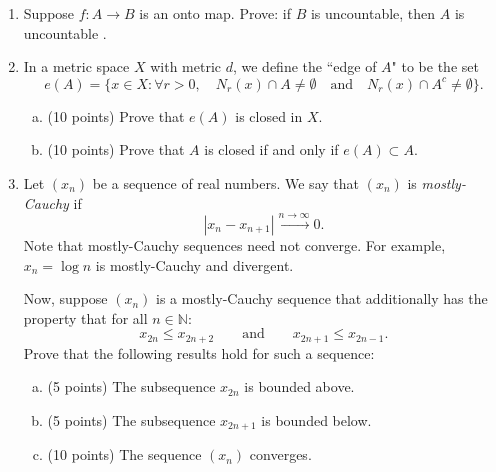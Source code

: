 \documentclass{amsart}
\begin{document}
\begin{enumerate}[1.]
\newpage
\item Suppose $f: A \to B$ is an onto map. Prove: if $B$ is uncountable, then $A$ is uncountable .

\newpage
\item In a metric space $X$ with metric $d$, we define the ``edge of $A$" to be the set
\[ e(A)=\{ x\in X : \forall r >0, \quad N_r(x)\cap A\neq \emptyset \quad \text{and} \quad N_r(x)\cap A^c \neq \emptyset   \}.\]
\begin{enumerate}[(a)]
	\item (10 points) Prove that $e(A)$ is closed in $X$.
	\item (10 points) Prove that $A$ is closed if and only if $e(A)\subset A$.
\end{enumerate}

\newpage
\item Let $(x_n)$ be a sequence of real numbers. We say that $(x_n)$ is \emph{mostly-Cauchy} if
\[ |x_n - x_{n+1}| \xrightarrow{n \to \infty} 0.\]
Note that mostly-Cauchy sequences need not converge. For example, $x_n=\log n$ is mostly-Cauchy and divergent.

Now, suppose $(x_n)$ is a mostly-Cauchy sequence that additionally has the property that for all $n \in \mathbb{N}$:
\[ x_{2n} \leq x_{2n+2} \qquad \text{and} \qquad x_{2n+1} \leq x_{2n-1}.\]
Prove that the following results hold for such a sequence:
\begin{enumerate}[(a)]
	\item (5 points) The subsequence $x_{2n}$ is bounded above.
	\item (5 points) The subsequence $x_{2n+1}$ is bounded below.
	\item (10 points) The sequence $(x_n)$ converges.
\end{enumerate}
\end{enumerate}
\end{document}
